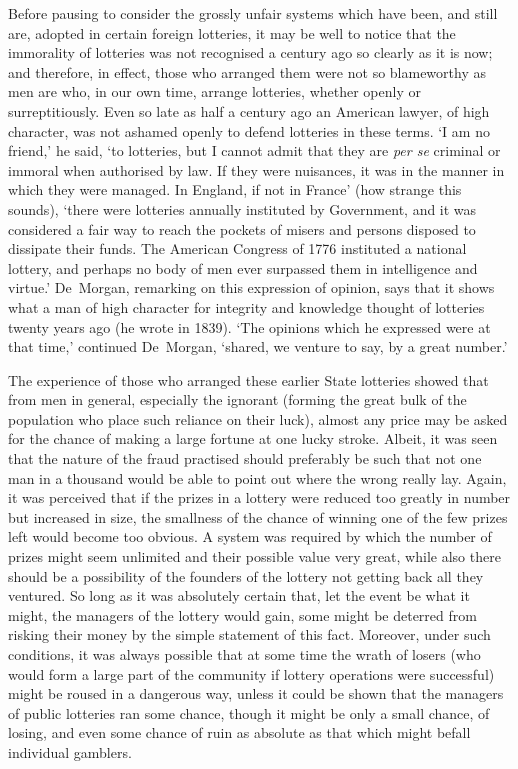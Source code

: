 \documentclass[letterpaper,12pt,oneside,openany]{memoir}
\begin{document}
Before pausing to consider the grossly unfair systems
which have been, and still are, adopted in certain foreign
lotteries, it may be well to notice that the immorality of
lotteries was not recognised a century ago so clearly as
it is now; and therefore, in effect, those who arranged
them were not so blameworthy as men are who, in our
own time, arrange lotteries, whether openly or surreptitiously.
Even so late as half a century ago an
American lawyer, of high character, was not ashamed
openly to defend lotteries in these terms. `I am no
friend,' he said, `to lotteries, but I cannot admit that
they are \textit{per se} criminal or immoral when authorised by
law. If they were nuisances, it was in the manner
in which they were managed. In England, if not in
France' (how strange this sounds), `there were lotteries
annually instituted by Government, and it was considered
a fair way to reach the pockets of misers and
persons disposed to dissipate their funds. The American
Congress of 1776 instituted a national lottery, and
perhaps no body of men ever surpassed them in intelligence and virtue.' De~Morgan, remarking on this
expression of opinion, says that it shows what a man of
high character for integrity and knowledge thought of
lotteries twenty years ago (he wrote in 1839). `The
opinions which he expressed were at that time,' continued
De~Morgan, `shared, we venture to say, by a
great number.'

The experience of those who arranged these earlier
State lotteries showed that from men in general, especially
the ignorant (forming the great bulk of the
population who place such reliance on their luck),
almost any price may be asked for the chance of making
a large fortune at one lucky stroke. Albeit, it was
seen that the nature of the fraud practised should
preferably be such that not one man in a thousand
would be able to point out where the wrong really lay.
Again, it was perceived that if the prizes in a lottery
were reduced too greatly in number but increased in
size, the smallness of the chance of winning one of the
few prizes left would become too obvious. A system
was required by which the number of prizes might seem
unlimited and their possible value very great, while also
there should be a possibility of the founders of the
lottery not getting back all they ventured. So long as
it was absolutely certain that, let the event be what it
might, the managers of the lottery would gain, some
might be deterred from risking their money by the
simple statement of this fact. Moreover, under such
conditions, it was always possible that at some time the
wrath of losers (who would form a large part of the
community if lottery operations were successful) might
be roused in a dangerous way, unless it could be shown
that the managers of public lotteries ran some chance,
though it might be only a small chance, of losing,
and even some chance of ruin as absolute as that which
might befall individual gamblers.
\end{document}
